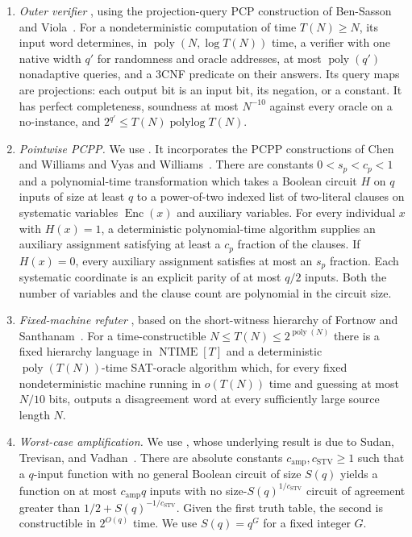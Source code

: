 \documentclass[11pt,letterpaper]{article}
\theoremstyle{definition}
\theoremstyle{remark}
\begin{document}
\begin{enumerate}
\item \emph{Outer verifier} \cite[Lemma~3.10]{CLW}, using the
projection-query PCP construction of Ben-Sasson and Viola~\cite{BenSassonViola}.
For a nondeterministic computation of time $T(N)\ge N$, its input word
determines, in $\operatorname{poly}(N,\log T(N))$ time, a verifier with
one native width $q'$ for randomness and oracle addresses, at most
$\operatorname{poly}(q')$ nonadaptive queries, and a 3CNF predicate on
their answers. Its query maps are projections: each output bit is an
input bit, its negation, or a constant. It has perfect completeness,
soundness at most $N^{-10}$ against every oracle on a no-instance, and
$2^{q'}\le T(N)\operatorname{polylog}T(N)$.

\item \emph{Pointwise PCPP.} We use \cite[Lemma~3.11]{CLW}.
It incorporates the PCPP constructions of Chen and Williams
\cite{ChenWilliams} and Vyas and Williams~\cite{VyasWilliams}.
There are constants $0<s_p<c_p<1$ and a polynomial-time transformation
which takes a Boolean circuit $H$ on $q$ inputs of size at least $q$ to
a power-of-two indexed list of two-literal clauses on systematic
variables $\operatorname{Enc}(x)$ and auxiliary variables.
For every individual $x$ with $H(x)=1$, a deterministic polynomial-time
algorithm supplies an auxiliary assignment satisfying at least a
$c_p$ fraction of the clauses. If $H(x)=0$, every auxiliary assignment
satisfies at most an $s_p$ fraction. Each systematic coordinate is an
explicit parity of at most $q/2$ inputs. Both the number of variables
and the clause count are polynomial in the circuit size.

\item \emph{Fixed-machine refuter} \cite[Theorem~4.6]{CLW}, based
on the short-witness hierarchy of Fortnow and
Santhanam~\cite{FortnowSanthanam}.
For a time-constructible $N\le T(N)\le2^{\operatorname{poly}(N)}$
there is a fixed hierarchy language in $\operatorname{NTIME}[T]$ and
a deterministic $\operatorname{poly}(T(N))$-time SAT-oracle algorithm
which, for every fixed nondeterministic machine running in $o(T(N))$
time and guessing at most $N/10$ bits, outputs a disagreement word
at every sufficiently large source length $N$.

\item \emph{Worst-case amplification.} We use
\cite[Lemma~3.9]{CLW}, whose underlying result is due to
Sudan, Trevisan, and Vadhan~\cite{STV}.
There are absolute constants $c_{\mathrm{amp}},c_{\mathrm{STV}}\ge1$
such that a $q$-input function with no general Boolean circuit of
size $S(q)$ yields a function on at most $c_{\mathrm{amp}}q$ inputs
with no size-$S(q)^{1/c_{\mathrm{STV}}}$ circuit of agreement greater
than $1/2+S(q)^{-1/c_{\mathrm{STV}}}$. Given the first truth table,
the second is constructible in $2^{O(q)}$ time. We use
$S(q)=q^G$ for a fixed integer $G$.
\end{enumerate}
\end{document}

